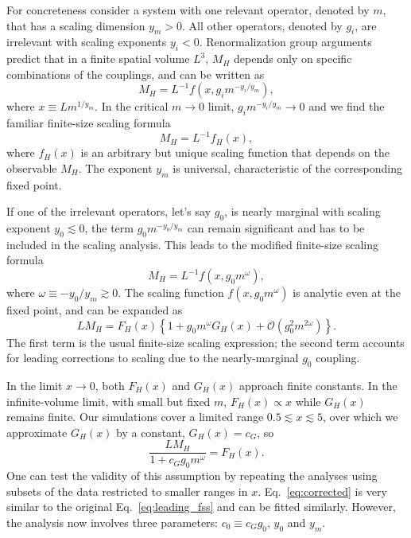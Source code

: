 \documentclass[aps,prl,twocolumn,]{revtex4}  %
\newcommand{\cO}{\ensuremath{\mathcal O} }
\newcommand{\lsim}{\ensuremath{\lesssim} }
\newcommand{\eq}[1]{Eq.~\ref{#1}}
\begin{document}
For concreteness consider a system with one relevant operator, denoted by $m$, that has a scaling dimension $y_m > 0$.
All other operators, denoted by $g_i$, are irrelevant with scaling exponents $y_i < 0$.
Renormalization group arguments predict that in a finite spatial volume $L^3$, $M_H$ depends only on specific combinations of the couplings, and can be written as
\begin{equation}
  \label{eq:general}
  M_H = L^{-1} f\left(x, g_i m^{-y_i / y_m}\right),
\end{equation}
where $x \equiv L m^{1 / y_m}$.
In the critical $m\to 0$ limit, $g_i m^{-y_i / y_m} \to 0$ and we find the familiar finite-size scaling formula
\begin{equation}
\label{eq:leading_fss}
  M_H = L^{-1} f_H(x),
\end{equation}
where $f_H(x)$ is an arbitrary but unique scaling function that
depends on the observable $M_H$. The exponent $y_m$  is universal, characteristic of the corresponding fixed point.

If one of the irrelevant operators, let's say $g_0$, is nearly marginal with scaling exponent $y_0 \lsim 0$, the term $g_0 m^{-y_0 / y_m}$ can remain significant and has to be included in the scaling analysis.
This leads to the modified finite-size scaling formula
\begin{equation}
  M_H = L^{-1} f\left(x, g_0 m^{\omega}\right),
\end{equation}
where $\omega \equiv -y_0 / y_m \gtrsim 0$.
The scaling function $f\left(x, g_0 m^{\omega}\right)$ is analytic even at the fixed point, and can be expanded as
\begin{equation}
  \label{eq:expansion}
  L M_H = F_H(x)\left\{1 + g_0 m^{\omega} G_H(x) + \cO\left(g_0^2 m^{2\omega}\right)\right\}.
\end{equation}
The first term is the usual finite-size scaling expression; the second term accounts for leading corrections to scaling due to the nearly-marginal $g_0$ coupling.


In the limit $x \to 0$, both $F_H(x)$ and $G_H(x)$ approach finite constants.
In the infinite-volume limit, with small but fixed $m$, $F_H(x)\propto x$ while $G_H(x)$ remains finite.
Our simulations cover a limited range $0.5 \lsim x \lsim 5$, over which we approximate $G_H(x)$ by a constant, $G_H(x) = c_G$, so 
\begin{equation}
  \label{eq:corrected}
  \frac{L M_H}{1 + c_G g_0 m^{\omega}} = F_H(x).
\end{equation}
One can test the validity of this assumption by repeating the analyses using subsets of the data restricted to smaller ranges in $x$.
\eq{eq:corrected} is very similar to the original \eq{eq:leading_fss} and can be fitted similarly.
However, the analysis now involves three parameters: $c_0 \equiv c_G g_0$, $y_0$ and $y_m$.
\end{document}

